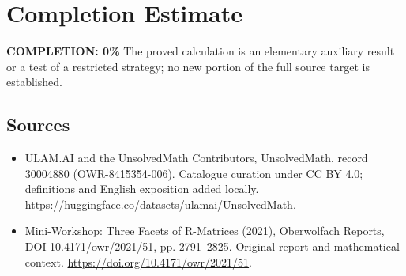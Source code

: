 \documentclass[11pt]{article}
\begin{document}
\section{Completion Estimate}
\noindent\textbf{COMPLETION: 0\%}
The proved calculation is an elementary auxiliary result or a test of a restricted strategy; no new portion of the full source target is established.

\subsection{Sources}
\begin{itemize}
\item[\hypertarget{source:30004880:1}{S1}] ULAM.AI and the UnsolvedMath Contributors, UnsolvedMath, record 30004880 (OWR-8415354-006). Catalogue curation under CC BY 4.0; definitions and English exposition added locally.
\url{https://huggingface.co/datasets/ulamai/UnsolvedMath}.
\item[\hypertarget{source:30004880:2}{S2}] Mini-Workshop: Three Facets of R-Matrices (2021), Oberwolfach Reports, DOI 10.4171/owr/2021/51, pp. 2791--2825. Original report and mathematical context.
\url{https://doi.org/10.4171/owr/2021/51}.
\end{itemize}
\label{end:30004880}
\end{document}
